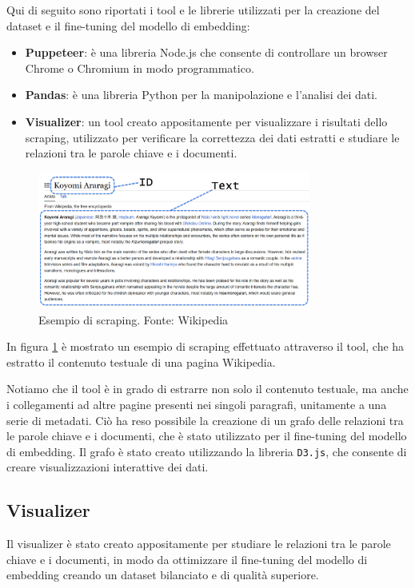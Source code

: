 Qui di seguito sono riportati i tool e le librerie
utilizzati per la creazione del dataset e il fine-tuning
del modello di embedding:

\begin{itemize}
      \item \textbf{Puppeteer}: è una libreria Node.js che consente di
            controllare un browser Chrome o Chromium in modo
            programmatico.
      \item \textbf{Pandas}: è una libreria Python per la manipolazione e
            l'analisi dei dati.
      \item \textbf{Visualizer}: un tool creato appositamente per
            visualizzare i risultati dello scraping, utilizzato per
            verificare la correttezza dei dati estratti e studiare le
            relazioni tra le parole chiave e i documenti.
\end{itemize}

\begin{figure}[H]
      \centering
      \includegraphics[width=0.8\textwidth]{res/scraper.png}
      \caption{Esempio di scraping. Fonte: Wikipedia}
      \label{fig:visualizer}
\end{figure}

In figura \ref{fig:visualizer} è mostrato un esempio di
scraping effettuato attraverso il tool, che ha estratto il
contenuto testuale di una pagina Wikipedia.

Notiamo che il tool è in grado di estrarre non solo il
contenuto testuale, ma anche i collegamenti ad altre pagine
presenti nei singoli paragrafi, unitamente a una serie di
metadati.
Ciò ha reso possibile la creazione di un grafo delle
relazioni tra le parole chiave e i documenti, che è stato
utilizzato per il fine-tuning del modello di embedding.
Il grafo è stato creato utilizzando la libreria
\texttt{D3.js}, che consente di creare visualizzazioni
interattive dei dati.

\subsection{Visualizer}
\label{sec:visualizer}
Il visualizer è stato creato appositamente per studiare le
relazioni tra le parole chiave e i documenti, in modo da
ottimizzare il fine-tuning del modello di embedding creando
un dataset bilanciato e di qualità superiore.

